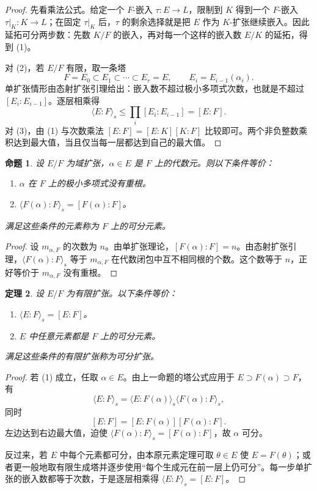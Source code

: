 \documentclass[11pt,a4paper,openany]{ctexbook}
\numberwithin{equation}{chapter}
\theoremstyle{plain}
\newtheorem{theorem}{定理}[chapter]
\newtheorem{proposition}[theorem]{命题}
\theoremstyle{definition}
\theoremstyle{remark}
\begin{document}
\begin{proof}
先看乘法公式。给定一个 $F$-嵌入 $\tau:E\to L$，限制到 $K$ 得到一个 $F$-嵌入 $\tau|_K:K\to L$；在固定 $\tau|_K$ 后，$\tau$ 的剩余选择就是把 $E$ 作为 $K$-扩张继续嵌入。因此延拓可分两步数：先数 $K/F$ 的嵌入，再对每一个这样的嵌入数 $E/K$ 的延拓，得到 (1)。

对 (2)，若 $E/F$ 有限，取一条塔
\[
F=E_0\subset E_1\subset\cdots\subset E_r=E,\qquad E_i=E_{i-1}(\alpha_i).
\]
单扩张情形由态射扩张引理给出：嵌入数不超过极小多项式次数，也就是不超过 $[E_i:E_{i-1}]$。逐层相乘得
\[
\langle E:F\rangle_s\le \prod_i [E_i:E_{i-1}]=[E:F].
\]
对 (3)，由 (1) 与次数乘法 $[E:F]=[E:K][K:F]$ 比较即可。两个非负整数乘积达到最大值，当且仅当每一层都达到自己的最大值。
\end{proof}

\begin{proposition}
设 $E/F$ 为域扩张，$\alpha\in E$ 是 $F$ 上的代数元。则以下条件等价：
\begin{enumerate}[label=(\arabic*)]
\item $\alpha$ 在 $F$ 上的极小多项式没有重根。
\item $\langle F(\alpha):F\rangle_s=[F(\alpha):F]$。
\end{enumerate}
满足这些条件的元素称为 $F$ 上的可分元素。
\end{proposition}

\begin{proof}
设 $m_{\alpha,F}$ 的次数为 $n$。由单扩张理论，$[F(\alpha):F]=n$。由态射扩张引理，$\langle F(\alpha):F\rangle_s$ 等于 $m_{\alpha,F}$ 在代数闭包中互不相同根的个数。这个数等于 $n$，正好等价于 $m_{\alpha,F}$ 没有重根。
\end{proof}

\begin{theorem}
设 $E/F$ 为有限扩张。以下条件等价：
\begin{enumerate}[label=(\arabic*)]
\item $\langle E:F\rangle_s=[E:F]$。
\item $E$ 中任意元素都是 $F$ 上的可分元素。
\end{enumerate}
满足这些条件的有限扩张称为可分扩张。
\end{theorem}

\begin{proof}
若 (1) 成立，任取 $\alpha\in E$。由上一命题的塔公式应用于 $E\supset F(\alpha)\supset F$，有
\[
\langle E:F\rangle_s=\langle E:F(\alpha)\rangle_s\langle F(\alpha):F\rangle_s,
\]
同时
\[
[E:F]=[E:F(\alpha)][F(\alpha):F].
\]
左边达到右边最大值，迫使 $\langle F(\alpha):F\rangle_s=[F(\alpha):F]$，故 $\alpha$ 可分。

反过来，若 $E$ 中每个元素都可分，由本原元素定理可取 $\theta\in E$ 使 $E=F(\theta)$；或者更一般地取有限生成塔并逐步使用“每个生成元在前一层上仍可分”。每一步单扩张的嵌入数都等于次数，于是逐层相乘得 $\langle E:F\rangle_s=[E:F]$。
\end{proof}
\end{document}
